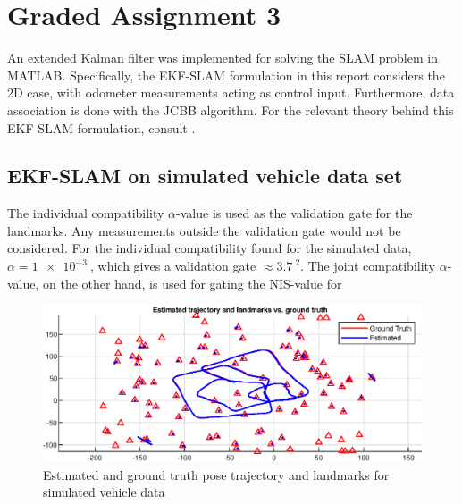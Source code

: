 \section{Graded Assignment 3}\label{sec:graded_assignment_3}



An extended Kalman filter was implemented for solving the SLAM problem in MATLAB. Specifically, the EKF-SLAM formulation in this report considers the 2D case, with odometer measurements acting as control input. Furthermore, data association is done with the JCBB algorithm. For the relevant theory behind this EKF-SLAM formulation, consult \cite[p. 185 - 196]{Edmund}.

\subsection{EKF-SLAM on simulated vehicle data set}

The individual compatibility $\alpha$-value is used as the validation gate for the landmarks. Any measurements outside the validation gate would not be considered. For the individual compatibility found for the simulated data, $\alpha = \SI{1e-3}{}$, which gives a validation gate $\approx \SI{3.7}{}^2$. The joint compatibility $\alpha$-value, on the other hand, is used for gating the NIS-value for 

\begin{figure}[!htb]
    \centering
    \includegraphics[width=0.8\linewidth]{figures/ga_3/sim_trajectory.eps}
    \caption{Estimated and ground truth pose trajectory and landmarks for simulated vehicle data}
    \label{fig:ga_3_sim_trajectory}
\end{figure}

